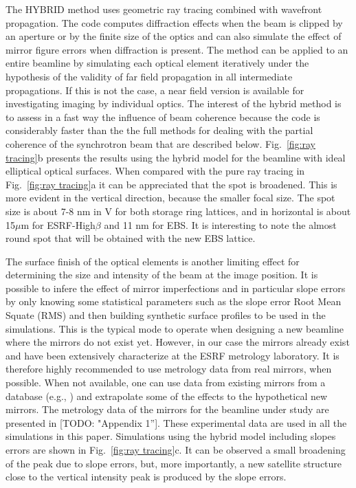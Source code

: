\documentclass{iucr}              %
\newcommand{\todo}[1]{{\color{red}[TODO: "#1'']}}
\begin{document}
The HYBRID method \cite{hybrid} uses geometric ray tracing combined with wavefront propagation. The code computes diffraction effects when the beam is clipped by an aperture or by the finite size of the optics and can also simulate the effect of mirror figure errors when diffraction is present. The method can be applied to an entire beamline by simulating each optical element iteratively under the hypothesis of the validity of far field propagation in all intermediate propagations. If this is not the case, a near field version is available for investigating imaging by individual optics. The interest of the hybrid method is to assess in a fast way the influence of beam coherence because the code is considerably faster than the the full methods for dealing with the partial coherence of the synchrotron beam that are described below. Fig.~\ref{fig:ray tracing}b presents the results using the hybrid model for the beamline with ideal elliptical optical surfaces. When compared with the pure ray tracing in Fig.~\ref{fig:ray tracing}a it can be appreciated that the spot is broadened. This is more evident in the vertical direction, because the smaller focal size. The spot size is about 7-8 nm in V for both storage ring lattices, and in horizontal is about 15$\mu$m for ESRF-High$\beta$ and 11 nm for EBS. It is interesting to note the almost round spot that will be obtained with the new EBS lattice. 

The surface finish of the optical elements is another limiting effect for determining the size and intensity of the beam at the image position. It is possible to infere the effect of mirror imperfections and in particular slope errors by only knowing some statistical parameters such as the slope error Root Mean Squate (RMS) and then building synthetic surface profiles to be used in the simulations. This is the typical mode to operate when designing a new beamline where the mirrors do not exist yet. However, in our case the mirrors already exist and have been extensively characterize at the ESRF metrology laboratory. It is therefore highly recommended to use metrology data from real mirrors, when possible. When not available, one can use data from existing mirrors from a database (e.g., \cite{dabam}) and extrapolate some of the effects to the hypothetical new mirrors. The metrology data of the mirrors for the beamline under study are presented in \todo{Appendix 1}. These experimental data are used in all the simulations in this paper. Simulations using the hybrid model including slopes errors are shown in Fig.~\ref{fig:ray tracing}c. It can be observed a small broadening of the peak due to slope errors, but, more importantly, a new satellite structure close to the vertical intensity peak is produced by the slope errors. 
\end{document}
